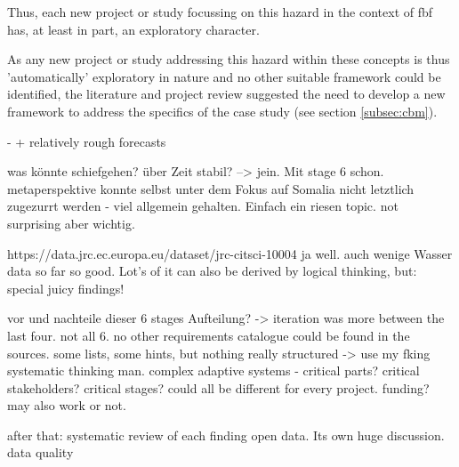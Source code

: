 Thus, each new project or study focussing on this hazard in the context of \acrshort{fbf} has, at least in part, an exploratory character.\newline

As any new project or study addressing this hazard within these concepts is thus 'automatically' exploratory in nature and no other suitable framework could be identified, the literature and project review suggested the need to develop a new framework to address the specifics of the case study (see section \ref{subsec:cbm}).

- + relatively rough forecasts





was könnte schiefgehen?
über Zeit stabil? --> jein. Mit stage 6 schon.
metaperspektive
konnte selbst unter dem Fokus auf Somalia nicht letztlich zugezurrt werden - viel allgemein gehalten. Einfach ein riesen topic. not surprising aber wichtig.

https://data.jrc.ec.europa.eu/dataset/jrc-citsci-10004
ja well. auch wenige Wasser data 
so far so good. Lot's of it can also be derived by logical thinking, but: special juicy findings!

vor und nachteile dieser 6 stages Aufteilung?
-> iteration was more between the last four. not all 6. no other requirements catalogue could be found in the sources. some lists, some hints, but nothing really structured
-> use my fking systematic thinking man.
complex adaptive systems - critical parts? critical stakeholders? critical stages? could all be different for every project.
funding? may also work or not. 



after that:
systematic review of each finding
open data. Its own huge discussion.
data quality


